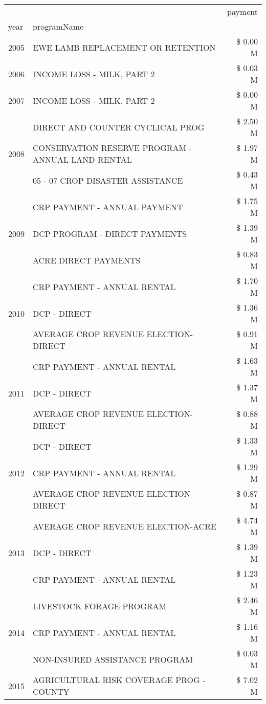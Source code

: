 \begin{tabular}{llr}
\toprule
 &  & payment \\
year & programName &  \\
\midrule
2005 & EWE LAMB REPLACEMENT OR RETENTION & \$ 0.00 M \\
\cline{1-3}
2006 & INCOME LOSS - MILK, PART 2 & \$ 0.03 M \\
\cline{1-3}
2007 & INCOME LOSS - MILK, PART 2 & \$ 0.00 M \\
\cline{1-3}
\multirow[t]{3}{*}{2008} & DIRECT AND COUNTER CYCLICAL PROG & \$ 2.50 M \\
 & CONSERVATION RESERVE PROGRAM - ANNUAL LAND RENTAL & \$ 1.97 M \\
 & 05 - 07 CROP DISASTER ASSISTANCE & \$ 0.43 M \\
\cline{1-3}
\multirow[t]{3}{*}{2009} & CRP PAYMENT - ANNUAL PAYMENT & \$ 1.75 M \\
 & DCP PROGRAM - DIRECT PAYMENTS & \$ 1.39 M \\
 & ACRE DIRECT PAYMENTS & \$ 0.83 M \\
\cline{1-3}
\multirow[t]{3}{*}{2010} & CRP PAYMENT - ANNUAL RENTAL & \$ 1.70 M \\
 & DCP - DIRECT & \$ 1.36 M \\
 & AVERAGE CROP REVENUE ELECTION-DIRECT & \$ 0.91 M \\
\cline{1-3}
\multirow[t]{3}{*}{2011} & CRP PAYMENT - ANNUAL RENTAL & \$ 1.63 M \\
 & DCP - DIRECT & \$ 1.37 M \\
 & AVERAGE CROP REVENUE ELECTION-DIRECT & \$ 0.88 M \\
\cline{1-3}
\multirow[t]{3}{*}{2012} & DCP - DIRECT & \$ 1.33 M \\
 & CRP PAYMENT - ANNUAL RENTAL & \$ 1.29 M \\
 & AVERAGE CROP REVENUE ELECTION-DIRECT & \$ 0.87 M \\
\cline{1-3}
\multirow[t]{3}{*}{2013} & AVERAGE CROP REVENUE ELECTION-ACRE & \$ 4.74 M \\
 & DCP - DIRECT & \$ 1.39 M \\
 & CRP PAYMENT - ANNUAL RENTAL & \$ 1.23 M \\
\cline{1-3}
\multirow[t]{3}{*}{2014} & LIVESTOCK FORAGE PROGRAM & \$ 2.46 M \\
 & CRP PAYMENT - ANNUAL RENTAL & \$ 1.16 M \\
 & NON-INSURED ASSISTANCE PROGRAM & \$ 0.03 M \\
\cline{1-3}
\multirow[t]{3}{*}{2015} & AGRICULTURAL RISK COVERAGE PROG - COUNTY & \$ 7.02 M \\

\end{tabular}
